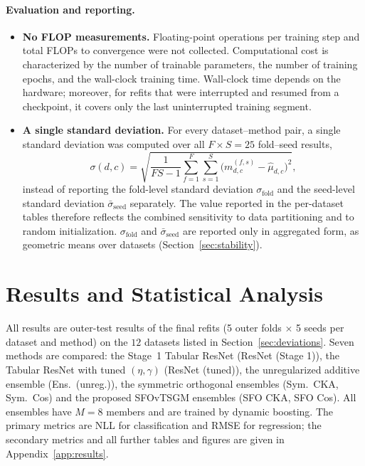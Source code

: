 \documentclass[11pt, a4paper]{article}
\begin{document}
\paragraph{Evaluation and reporting.}
\begin{itemize}
    \item \textbf{No FLOP measurements.} Floating-point operations per training step and total FLOPs to convergence were not collected. Computational cost is characterized by the number of trainable parameters, the number of training epochs, and the wall-clock training time. Wall-clock time depends on the hardware; moreover, for refits that were interrupted and resumed from a checkpoint, it covers only the last uninterrupted training segment.
    \item \textbf{A single standard deviation.} For every dataset--method pair, a single standard deviation was computed over all $F \times S = 25$ fold--seed results,
    \begin{equation}
        \sigma(d,c) = \sqrt{\frac{1}{FS - 1} \sum_{f=1}^{F} \sum_{s=1}^{S} \big(m_{d,c}^{(f,s)} - \hat{\mu}_{d,c}\big)^2},
    \end{equation}
    instead of reporting the fold-level standard deviation $\sigma_{\text{fold}}$ and the seed-level standard deviation $\bar{\sigma}_{\text{seed}}$ separately. The value reported in the per-dataset tables therefore reflects the combined sensitivity to data partitioning and to random initialization. $\sigma_{\text{fold}}$ and $\bar{\sigma}_{\text{seed}}$ are reported only in aggregated form, as geometric means over datasets (Section~\ref{sec:stability}).
\end{itemize}

\section{Results and Statistical Analysis}

All results are outer-test results of the final refits (5 outer folds $\times$ 5 seeds per dataset and method) on the $12$ datasets listed in Section~\ref{sec:deviations}. Seven methods are compared: the Stage~1 Tabular ResNet (ResNet (Stage 1)), the Tabular ResNet with tuned $(\eta, \gamma)$ (ResNet (tuned)), the unregularized additive ensemble (Ens.\ (unreg.)), the symmetric orthogonal ensembles (Sym.\ CKA, Sym.\ Cos) and the proposed SFOvTSGM ensembles (SFO CKA, SFO Cos). All ensembles have $M = 8$ members and are trained by dynamic boosting. The primary metrics are NLL for classification and RMSE for regression; the secondary metrics and all further tables and figures are given in Appendix~\ref{app:results}.
\end{document}
